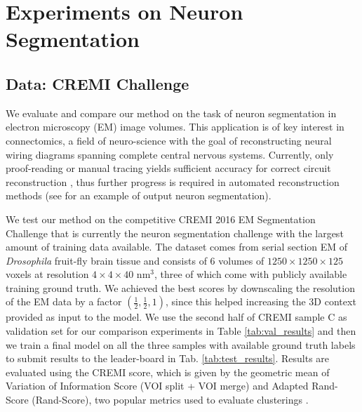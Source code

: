 
\section{Experiments on Neuron Segmentation}
\subsection{Data: CREMI Challenge} \label{sec:cremi_challenge}
We evaluate and compare our method on the task of neuron segmentation in electron microscopy (EM) image volumes. This application is of key interest in connectomics, a field of neuro-science with the goal of reconstructing neural wiring diagrams spanning complete central nervous systems. Currently, only proof-reading or manual tracing yields sufficient accuracy for correct circuit reconstruction \cite{schlegel2017learning}, thus further progress is required in automated reconstruction methods (see  for an example of output neuron segmentation).

We test our method on the competitive CREMI 2016 EM Segmentation Challenge \cite{cremiChallenge} that is currently the neuron segmentation challenge with the largest amount of training data available. The dataset comes from serial section EM of \emph{Drosophila} fruit-fly brain tissue and consists of 6 volumes of $1250\times 1250\times 125$ voxels at resolution $4\times 4\times 40$ nm$^3$, three of which come with publicly available training ground truth. 
We achieved the best scores by downscaling the resolution of the EM data by a factor $(\frac{1}{2},\frac{1}{2},1)$, since this helped increasing the 3D context provided as input to the model.
We use the second half of CREMI sample C as validation set for our comparison experiments in Table \ref{tab:val_results} and then we train a final model on all the three samples with available ground truth labels to submit results to the leader-board in Tab. \ref{tab:test_results}. 
Results  are evaluated using the CREMI score, which is given by the geometric mean of Variation of Information Score (VOI split + VOI merge) and Adapted Rand-Score (Rand-Score), two popular metrics used to evaluate clusterings \cite{arganda2015crowdsourcing}.

